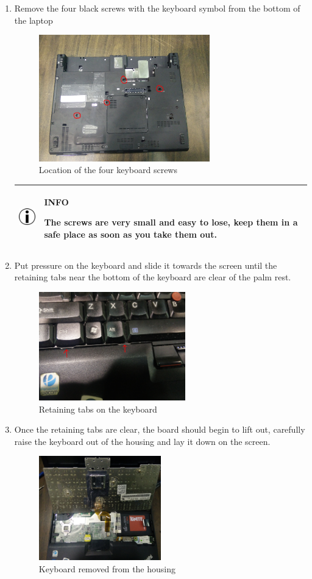 \documentclass{article}
\newcommand{\alertinfobox}[2]{
	\begin{center}
		\begin{tabularx}{0.9\linewidth}{| c X |}
			\hline
			\raisebox{\dimexpr2\baselineskip-\height}
			{\includegraphics[width=0.5in]{info.jpg}}&
			\raisebox{\tabcolsep}{\strut}\par\textbf{#1}\par#2\raisebox{-\tabcolsep}{\strut} \\ \hline
		\end{tabularx}
	\end{center}
}
\begin{document}
\begin{enumerate}
	\clearpage
	\item Remove the four black screws with the keyboard symbol from the bottom of the laptop
	\begin{figure}[H]
		\centering
		\includegraphics[width=0.7\textwidth]{keyboardscrews.jpg}
		\caption{Location of the four keyboard screws}
		\label{fig:screws}
	\end{figure}

	\alertinfobox{INFO}{
		The screws are very small and easy to lose, keep them in a safe place as soon as you take them out.
	}

	\item Put pressure on the keyboard and slide it towards the screen until the retaining tabs near the bottom of the keyboard are clear of the palm rest.
	\begin{figure}[H]
		\centering
		\includegraphics[width=0.6\textwidth]{keyboardslide.jpg}
		\caption{Retaining tabs on the keyboard}
	\end{figure}

	\item Once the retaining tabs are clear, the board should begin to lift out, carefully raise the keyboard out of the housing and lay it down on the screen.
	\begin{figure}[H]
		\centering
		\includegraphics[width=0.5\textwidth]{keyboardonscreen.jpg}
		\caption{Keyboard removed from the housing}
	\end{figure}


\end{enumerate}
\end{document}
